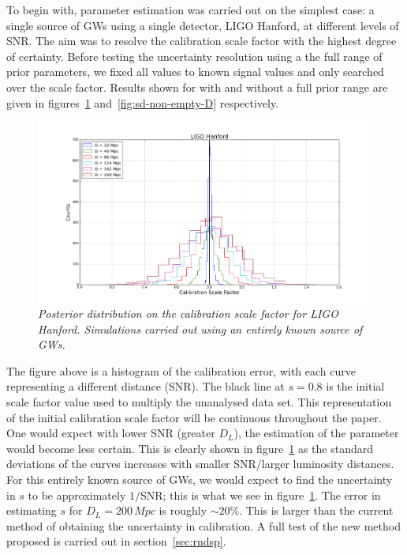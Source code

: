 \documentclass[12pt]{iopart}
\begin{document}
To begin with, parameter estimation was carried out on the simplest case: a
single source of GWs using a single detector, LIGO Hanford, at different levels
of SNR. The aim was to resolve the calibration scale factor with the highest
degree of certainty.  Before testing the uncertainty resolution using a the
full range of prior parameters, we fixed all values to known signal values and
only searched over the scale factor. Results shown for with and without a full
prior range are given in figures~\ref{fig:sd-empty-D}
and~\ref{fig:sd-non-empty-D} respectively.


\begin{figure}
  \centering
  \includegraphics[width = \textwidth]{SD_empty_D10_200}
  \caption{\textit{Posterior distribution on the calibration scale factor for
LIGO Hanford. Simulations carried out using an entirely known source of GWs.}}
  \label{fig:sd-empty-D}
\end{figure}

The figure above is a histogram of the calibration error, with each curve
representing a different distance (SNR). The black line at $s = 0.8$ is the
initial scale factor value used to multiply the unanalysed data set. This
representation of the initial calibration scale factor will be continuous
throughout the paper.  One would expect with lower SNR (greater $D_{L}$), the
estimation of the parameter would become less certain. This is clearly shown in
figure~\ref{fig:sd-empty-D} as the standard deviations of the curves increases
with smaller SNR/larger luminosity distances. For this entirely known source of
GWs, we would expect to find the uncertainty in $s$ to be approximately
$1/$SNR; this is what we see in figure~\ref{fig:sd-empty-D}. The error in
estimating $s$ for $D_{L} = 200 \,Mpc$ is roughly $\sim 20\%$. This is larger
than the current method of obtaining the uncertainty in calibration. A full
test of the new method proposed is carried out in section~\ref{sec:rndsp}.
\end{document}
